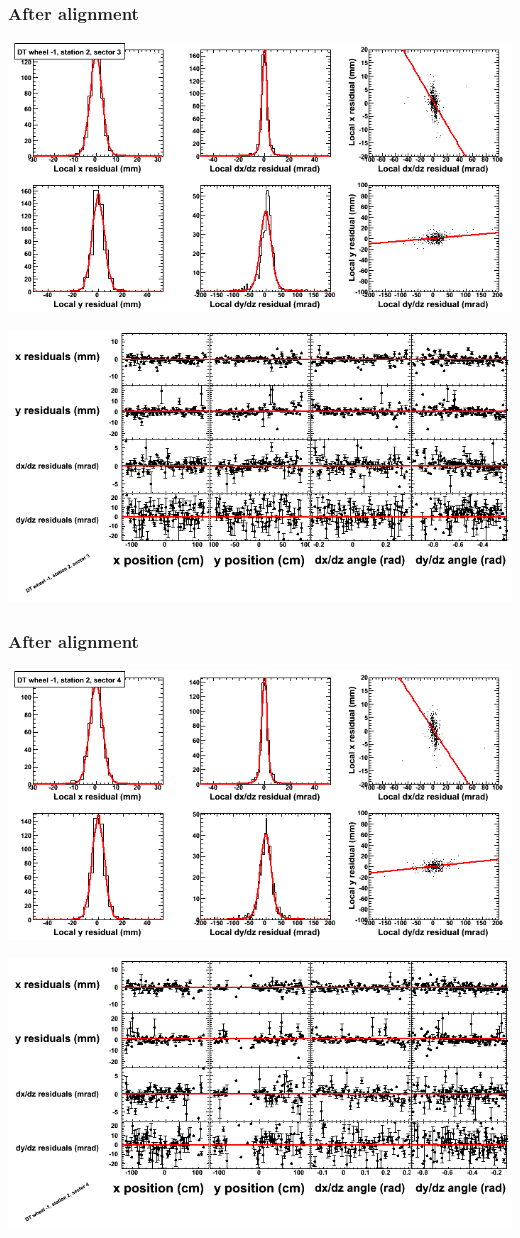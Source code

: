 \documentclass[compress]{beamer}
\begin{document}
\begin{frame}
\frametitle{After alignment}
\includegraphics[width=0.7\linewidth]{NOV4_fitfunctions/MBwhBst2sec03_bellcurves.png}

\includegraphics[width=0.7\linewidth]{NOV4_fitfunctions/MBwhBst2sec03_polynomials.png}
\end{frame}

\begin{frame}
\frametitle{After alignment}
\includegraphics[width=0.7\linewidth]{NOV4_fitfunctions/MBwhBst2sec04_bellcurves.png}

\includegraphics[width=0.7\linewidth]{NOV4_fitfunctions/MBwhBst2sec04_polynomials.png}
\end{frame}
\end{document}
